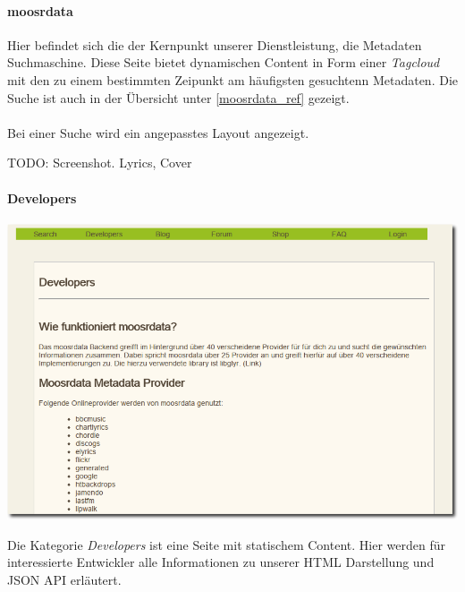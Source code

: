 \paragraph{moosrdata}
Hier befindet sich die der Kernpunkt unserer Dienstleistung, die Metadaten
Suchmaschine. Diese Seite bietet dynamischen Content in Form einer
\emph{Tagcloud} mit den zu einem bestimmten Zeipunkt am häufigsten gesuchtenn
Metadaten. Die Suche ist auch in der Übersicht unter \ref{moosrdata_ref}
gezeigt.
\\
\\
Bei einer Suche wird ein angepasstes Layout angezeigt. 

TODO: Screenshot. Lyrics, Cover


\newpage
\paragraph{Developers}
\label{static_page}
\begin{center}
\includegraphics[scale=0.5]{../screenshots/developers.png}
\end{center}

Die Kategorie \emph{Developers} ist eine Seite mit statischem Content. Hier
werden für interessierte Entwickler alle Informationen zu unserer HTML
Darstellung und JSON API erläutert.

